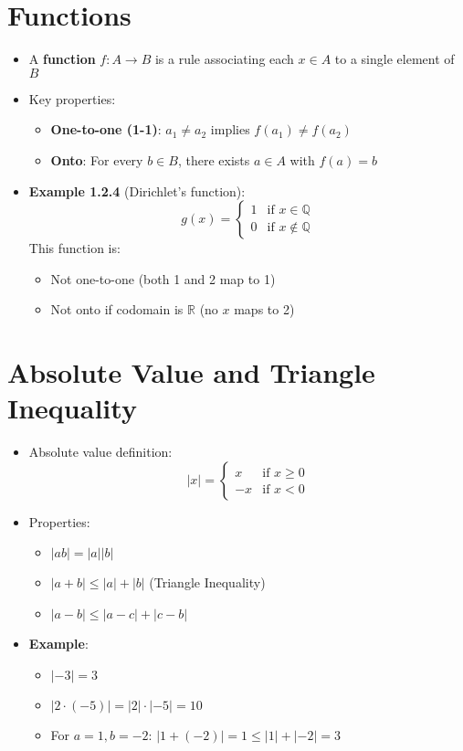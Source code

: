 \documentclass{article}
\begin{document}
\section{Functions}
\begin{itemize}
    \item A \textbf{function} $f : A \to B$ is a rule associating each $x \in A$ to a single element of $B$
    \item Key properties:
    \begin{itemize}
        \item \textbf{One-to-one (1-1)}: $a_1 \neq a_2$ implies $f(a_1) \neq f(a_2)$
        \item \textbf{Onto}: For every $b \in B$, there exists $a \in A$ with $f(a) = b$
    \end{itemize}
    
    \item \textbf{Example 1.2.4} (Dirichlet's function):
    \[
    g(x) = 
    \begin{cases} 
    1 & \text{if } x \in \mathbb{Q} \\
    0 & \text{if } x \notin \mathbb{Q} 
    \end{cases}
    \]
    This function is:
    \begin{itemize}
        \item Not one-to-one (both 1 and 2 map to 1)
        \item Not onto if codomain is $\mathbb{R}$ (no $x$ maps to 2)
    \end{itemize}
\end{itemize}

\section{Absolute Value and Triangle Inequality}
\begin{itemize}
    \item Absolute value definition:
    \[
    |x| = 
    \begin{cases} 
    x & \text{if } x \geq 0 \\
    -x & \text{if } x < 0 
    \end{cases}
    \]
    \item Properties:
    \begin{itemize}
        \item $|ab| = |a||b|$
        \item $|a + b| \leq |a| + |b|$ (Triangle Inequality)
        \item $|a - b| \leq |a - c| + |c - b|$
    \end{itemize}
    
    \item \textbf{Example}:
    \begin{itemize}
        \item $|-3| = 3$
        \item $|2 \cdot (-5)| = |2| \cdot |-5| = 10$
        \item For $a = 1, b = -2$: $|1 + (-2)| = 1 \leq |1| + |-2| = 3$
    \end{itemize}
\end{itemize}
\end{document}
